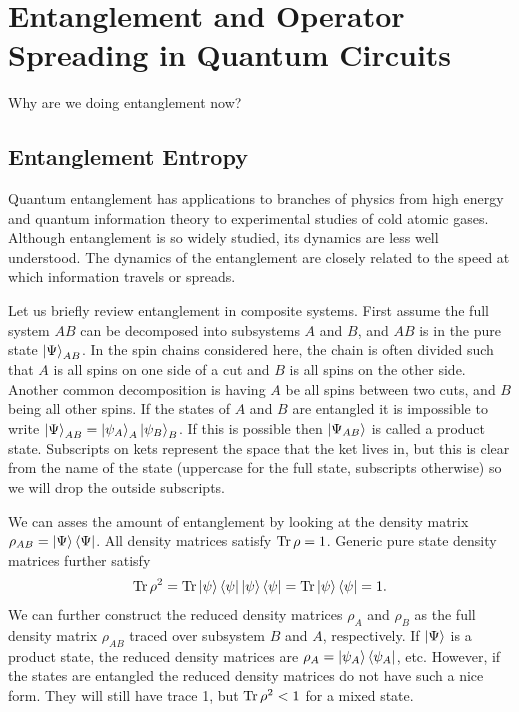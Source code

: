 \section{Entanglement and Operator Spreading in Quantum Circuits} \label{sec:circuits}

Why are we doing entanglement now?

\subsection{Entanglement Entropy} \label{sub:intro}

Quantum entanglement has applications to branches of physics from high energy and quantum information theory to experimental studies of cold atomic gases. Although entanglement is so widely studied, its dynamics are less well understood. The dynamics of the entanglement are closely related to the speed at which information travels or spreads. 

Let us briefly review entanglement in composite systems. First assume the full system $AB$ can be decomposed into subsystems $A$ and $B$, and $AB$ is in the pure state $\left|\Psi\right\rangle_{{AB}}$. In the spin chains considered here, the chain is often divided such that $A$ is all spins on one side of a cut and $B$ is all spins on the other side. Another common decomposition is having $A$ be all spins between two cuts, and $B$ being all other spins. If the states of $A$ and $B$ are entangled it is impossible to write $\left|\Psi\right\rangle_{AB} = \left|\psi_A\right\rangle_A \left|\psi_B\right\rangle_B$. If this is possible then $\left|\Psi_{{AB}}\right\rangle$ is called a product state. Subscripts on kets represent the space that the ket lives in, but this is clear from the name of the state (uppercase for the full state, subscripts otherwise) so we will drop the outside subscripts.

We can asses the amount of entanglement by looking at the density matrix $\rho_{AB} = \left|\Psi\right\rangle\left\langle\Psi\right|$. All density matrices satisfy $\operatorname{Tr} \rho = 1$. Generic pure state density matrices further satisfy 
\begin{align}
\operatorname{Tr} \rho^2 = \operatorname{Tr}\left|\psi\right\rangle\left\langle\psi\right|\left|\psi\right\rangle\left\langle\psi\right| = \operatorname{Tr}\left|\psi\right\rangle\left\langle\psi\right| = 1.
\end{align}
We can further construct the reduced density matrices $\rho_A$ and $\rho_B$ as the full density matrix $\rho_{AB}$ traced over subsystem $B$ and $A$, respectively. If $\left|\Psi\right\rangle$ is a product state, the reduced density matrices are $\rho_A = \left|\psi_A\right\rangle\left\langle\psi_A\right|$, etc. However, if the states are entangled the reduced density matrices do not have such a nice form. They will still have trace 1, but $\operatorname{Tr}\rho^2<1$ for a mixed state.

